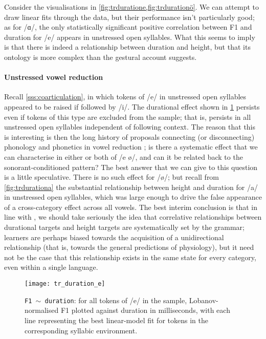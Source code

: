 Consider the visualisations in \cref{fig:trduratione,fig:trdurationö}. We can attempt to draw linear fits through the data, but their performance isn't particularly good; as for /ɑ/, the only statistically significant positive correlation between F1 and duration for /e/ appears in unstressed open syllables. What this seems to imply is that there is indeed a relationship between duration and height, but that its ontology is more complex than the gestural account suggests.

\paragraph{Unstressed vowel reduction} Recall \cref{sss:coarticulation}, in which tokens of /e/ in unstressed open syllables appeared to be raised if followed by /i/. The durational effect shown in \cref{fig:trduratione} persists even if tokens of this type are excluded from the sample; that is, persists in all unstressed open syllables independent of following context. The reason that this is interesting is then the long history of proposals connecting (or disconnecting) phonology and phonetics in vowel reduction \citep{Barnes2007,Iosad2012}; is there a systematic effect that we can characterise in either or both of /e ø/, and can it be related back to the sonorant-conditioned pattern? The best answer that we can give to this question is a little speculative. There is no such effect for /ø/; but recall from \cref{fig:trdurationa} the substantial relationship between height and duration for /a/ in unstressed open syllables, which was large enough to drive the false appearance of a cross-category effect across all vowels. The best interim conclusion is that in line with \citet{Tauberer2009,Sole2010,Toivonen2015}, we should take seriously the idea that correlative relationships between durational targets and height targets are systematically set by the grammar; learners are perhaps biased towards the acquisition of a unidirectional relationship (that is, towards the general predictions of physiology), but it need not be the case that this relationship exists in the same state for every category, even within a single language.

\begin{figure}[ht]
  \centering
  \texttt{[image: tr\_duration\_e]}
  \caption[\texttt{F1 $\sim$ duration} correlation for /e/, split by environment.]{\texttt{F1 $\sim$ duration}: for all tokens of /e/ in the sample, Lobanov-normalised F1 plotted against duration in milliseconds, with each line representing the best linear-model fit for tokens in the corresponding syllabic environment.}
  \label{fig:trduratione}
\end{figure}

